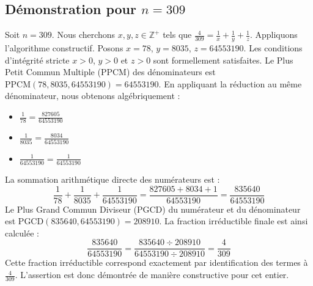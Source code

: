 \documentclass[11pt,a4paper]{article}
\begin{document}
\subsection{Démonstration pour $n = 309$}
Soit $n = 309$. Nous cherchons $x, y, z \in \mathbb{Z}^{+}$ tels que $\frac{4}{309} = \frac{1}{x} + \frac{1}{y} + \frac{1}{z}$.
Appliquons l'algorithme constructif. Posons $x = 78$, $y = 8035$, $z = 64553190$.
Les conditions d'intégrité stricte $x > 0$, $y > 0$ et $z > 0$ sont formellement satisfaites.
Le Plus Petit Commun Multiple (PPCM) des dénominateurs est $\text{PPCM}(78, 8035, 64553190) = 64553190$.
En appliquant la réduction au même dénominateur, nous obtenons algébriquement :
\begin{itemize}
    \item $\frac{1}{78} = \frac{827605}{64553190}$
    \item $\frac{1}{8035} = \frac{8034}{64553190}$
    \item $\frac{1}{64553190} = \frac{1}{64553190}$
\end{itemize}
La sommation arithmétique directe des numérateurs est :
$$ \frac{1}{78} + \frac{1}{8035} + \frac{1}{64553190} = \frac{827605 + 8034 + 1}{64553190} = \frac{835640}{64553190} $$
Le Plus Grand Commun Diviseur (PGCD) du numérateur et du dénominateur est $\text{PGCD}(835640, 64553190) = 208910$.
La fraction irréductible finale est ainsi calculée :
$$ \frac{835640}{64553190} = \frac{835640 \div 208910}{64553190 \div 208910} = \frac{4}{309} $$
Cette fraction irréductible correspond exactement par identification des termes à $\frac{4}{309}$. L'assertion est donc démontrée de manière constructive pour cet entier.
\end{document}
